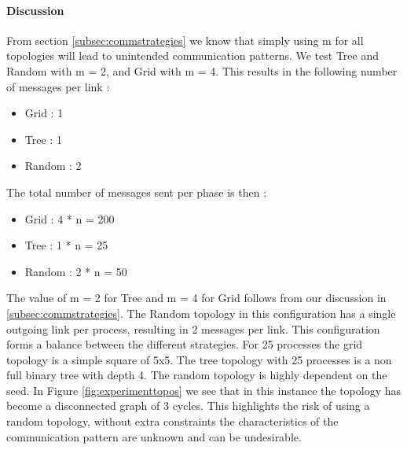 \paragraph{Discussion}
From section \ref{subsec:commstrategies}
we know that simply using m for all topologies will lead to unintended communication patterns. We test Tree and Random with m = 2, and Grid with m = 4. This results in the following number of messages per link :
\begin{itemize}
\item Grid : 1
\item Tree : 1
\item Random : 2
\end{itemize}
The total number of messages sent per phase is then :
\begin{itemize}
\item Grid : 4 * n = 200
\item Tree : 1 * n = 25
\item Random : 2 * n = 50
\end{itemize}
The value of m = 2 for Tree and m = 4 for Grid follows from our discussion in \ref{subsec:commstrategies}. The Random topology in this configuration has a single outgoing link per process, resulting in 2 messages per link. This configuration forms a balance between the different strategies.
For 25 processes the grid topology is a simple square of 5x5. The tree topology with 25 processes is a non full binary tree with depth 4. The random topology is highly dependent on the seed. In Figure \ref{fig:experimenttopos} we see that in this instance the topology has become a disconnected graph of 3 cycles. This highlights the risk of using a random topology, without extra constraints the characteristics of the communication pattern are unknown and can be undesirable.
